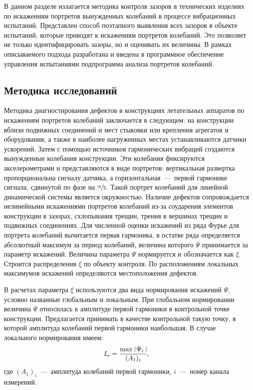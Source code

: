 В данном разделе излагается методика контроля зазоров в технических изделиях по искажениям портретов вынужденных колебаний в процессе вибрационных испытаний. Представлен способ поэтапного выявления всех зазоров в объекте испытаний, которые приводят к искажениям портретов колебаний. Это позволяет не только идентифицировать зазоры, но и оценивать их величины. В рамках описываемого подхода разработана и введена в программное обеспечение управления испытаниями подпрограмма анализа портретов колебаний. 

\subsection{Методика исследований}

Методика диагностирования дефектов в конструкциях летательных аппаратов по искажениям портретов колебаний заключается в следующем: на конструкции вблизи подвижных соединений и мест стыковки или крепления агрегатов и оборудования, а также в наиболее нагруженных местах устанавливаются датчики ускорений. Затем с помощью источников гармонических вибраций создаются вынужденные колебания конструкции. Эти колебания фиксируются акселерометрами и представляются в виде портретов: вертикальная развертка пропорциональна сигналу датчика, а горизонтальная~---~первой гармонике сигнала, сдвинутой по фазе на $ \sfrac{\uppi}{2} $. Такой портрет колебаний для линейной динамической системы является окружностью. Наличие дефектов сопровождается нелинейными искажениями портретов колебаний из-за соударения элементов конструкции в зазорах, схлопывания трещин, трения в вершинах трещин и подвижных соединениях. Для численной оценки искажений из ряда Фурье для портрета колебаний вычитается первая гармоника, в остатке ряда определяется абсолютный максимум за период колебаний, величина которого $ \Psi $ принимается за параметр искажений. Величина параметра $ \Psi $ нормируется и обозначается как $ \xi $. Строится распределения $ \xi $ по объекту контроля. По расположениям локальных максимумов искажений определяются местоположения дефектов.

В расчетах параметра $ \xi $ используются два вида нормирования искажений $ \Psi $, условно названные глобальным и локальным. При глобальном нормировании величина $ \Psi $ относилась к амплитуде первой гармоники в контрольной точке конструкции. Предлагается принимать в качестве контрольной такую точку, в которой амплитуда колебаний первой гармоники наибольшая. В случае локального нормирования имеем:
\begin{equation}
	\xi_i = \frac{\max \ \vline \Psi_i \ \vline}{(A_1)_i},
\end{equation}
где $ (A_1)_i $~---~амплитуда колебаний первой гармоники, $ i $~---~номер канала измерений.

